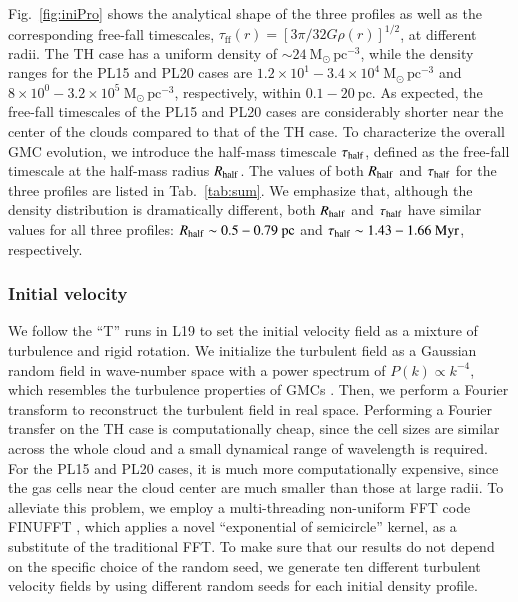 \documentclass[fleqn,usenatbib]{mnras}
\begin{document}
Fig.~\ref{fig:iniPro} shows the analytical shape of the three profiles as well as the corresponding free-fall timescales, $\tau_{\mathrm{ff}}(r)=[3\pi/32G\rho(r)]^{1/2}$, at different radii.
The TH case has a uniform density of $\sim24\ \mathrm{M_\odot\,pc^{-3}}$, while the density ranges for the PL15 and PL20 cases are $1.2\times10^1-3.4\times10^4\ \mathrm{M_\odot\,pc^{-3}}$ and $8\times10^0-3.2\times10^5\ \mathrm{M_\odot\,pc^{-3}}$, respectively, within $0.1-20\ \mathrm{pc}$.
As expected, the free-fall timescales of the PL15 and PL20 cases are considerably shorter near the center of the clouds compared to that of the TH case.
To characterize the overall GMC evolution, we introduce the half-mass timescale $\tau_{\rm half}$, defined as the free-fall timescale at the half-mass radius $R_{\rm half}$.
The values of both $R_{\rm half}$ and $\tau_{\rm half}$ for the three profiles are listed in Tab.~\ref{tab:sum}.
We emphasize that, although the density distribution is dramatically different, both $R_{\rm half}$ and $\tau_{\rm half}$ have similar values for all three profiles: $R_{\rm half}\sim0.5-0.79\ \mathrm{pc}$ and $\tau_{\rm half}\sim1.43-1.66\ \mathrm{Myr}$, respectively.

\subsubsection{Initial velocity}
\label{sec:initialVelocity}

We follow the ``T'' runs in L19 to set the initial velocity field as a mixture of turbulence and rigid rotation.
We initialize the turbulent field as a Gaussian random field in wave-number space with a power spectrum of $P(k)\propto k^{-4}$, which resembles the turbulence properties of GMCs \citep{dobbs_formation_2014}.
Then, we perform a Fourier transform to reconstruct the turbulent field in real space.
Performing a Fourier transfer on the TH case is computationally cheap, since the cell sizes are similar across the whole cloud and a small dynamical range of wavelength is required.
For the PL15 and PL20 cases, it is much more computationally expensive, since the gas cells near the cloud center are much smaller than those at large radii.
To alleviate this problem, we employ a multi-threading non-uniform FFT code \textsc{FINUFFT} \citep{barnett_parallel_2018}, which applies a novel ``exponential of semicircle'' kernel, as a substitute of the traditional FFT. To make sure that our results do not depend on the specific choice of the random seed, we generate ten different turbulent velocity fields by using different random seeds for each initial density profile.
\end{document}
